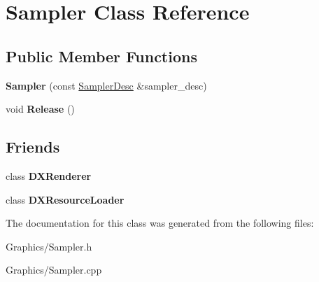 \hypertarget{classSampler}{}\section{Sampler Class Reference}
\label{classSampler}
\subsection*{Public Member Functions}
\begin{DoxyCompactItemize}
\item 
\mbox{\label{classSampler_ab3458a722d2ffe056a8529b23472c95f}} 
{\bfseries Sampler} (const \hyperlink{structSamplerDesc}{Sampler\+Desc} \&sampler\+\_\+desc)
\item 
\mbox{\label{classSampler_a90f8092f4149944bd831a44b4ced71a4}} 
void {\bfseries Release} ()
\end{DoxyCompactItemize}
\subsection*{Friends}
\begin{DoxyCompactItemize}
\item 
\mbox{\label{classSampler_a14ab6f966322dccbf6597d0c82bf48c6}} 
class {\bfseries D\+X\+Renderer}
\item 
\mbox{\label{classSampler_a871268c492209c5a9db9dc2db99f4d04}} 
class {\bfseries D\+X\+Resource\+Loader}
\end{DoxyCompactItemize}


The documentation for this class was generated from the following files\+:\begin{DoxyCompactItemize}
\item 
Graphics/Sampler.\+h\item 
Graphics/Sampler.\+cpp\end{DoxyCompactItemize}
